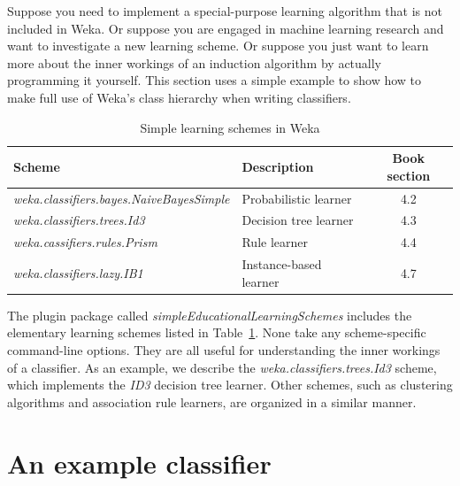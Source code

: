 Suppose you need to implement a special-purpose learning algorithm
that is not included in Weka. Or suppose you are engaged in machine
learning research and want to investigate a new learning scheme. Or
suppose you just want to learn more about the inner workings of an
induction algorithm by actually programming it yourself. This section
uses a simple example to show how to make full use of Weka's class
hierarchy when writing classifiers.

\begin{table}[!th]
\footnotesize
{\centering \begin{tabular}{llc}
\hline
Scheme & Description & Book section \\
\hline
\textit{weka.classifiers.bayes.NaiveBayesSimple} & Probabilistic learner & 4.2 \\
\textit{weka.classifiers.trees.Id3} & Decision tree learner & 4.3 \\
\textit{weka.cassifiers.rules.Prism} & Rule learner & 4.4 \\
\textit{weka.classifiers.lazy.IB1} & Instance-based learner & 4.7 \\
\hline
\end{tabular} \footnotesize \par}
\caption{\label{table:simple_schemes}Simple learning schemes in Weka}
\end{table}


The plugin package called \textit{simpleEducationalLearningSchemes}
includes the elementary learning schemes listed in
Table~\ref{table:simple_schemes}. None take any scheme-specific
command-line options. They are all useful for understanding the inner
workings of a classifier. As an example, we describe
the \textit{weka.classifiers.trees.Id3} scheme, which implements
the \textit{ID3} decision tree learner. Other schemes, such as
clustering algorithms and association rule learners, are organized in
a similar manner.

\section{An example classifier}

